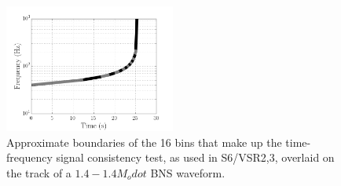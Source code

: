 




\begin{figure}
\centering
\includegraphics[width=0.5\textwidth]{papers/bns_o1_dev/figures/bin.png}
\caption{\label{fig:chisqbins} 
Approximate boundaries of the 16 bins that make up the time-frequency signal consistency test, as used in S6/VSR2,3, overlaid on the track of a $1.4-1.4M_odot$ BNS waveform. 
}
\end{figure}

